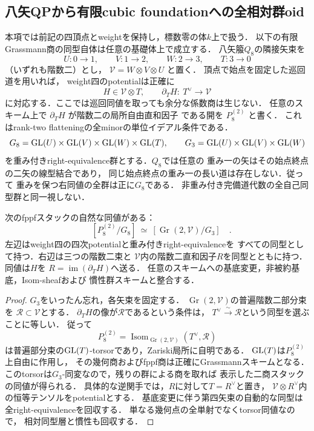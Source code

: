 
\subsection{八矢QPから有限cubic foundationへの全相対群oid}
\label{subsec:qa-cubic-qp-foundation-groupoid}

本項では前記の四頂点とweightを保持し，標数零の体$k$上で扱う．
以下の有限Grassmann商の同型自体は任意の基礎体上で成立する．
八矢箙$Q_8$の隣接矢束を
\[
 U:0\to1,\qquad V:1\to2,\qquad W:2\to3,\qquad T:3\to0
\]
（いずれも階数二）とし，
\(\mathcal V=W\otimes V\otimes U\) と置く．
頂点で始点を固定した巡回道を用いれば，
weight四のpotentialは正確に
\[
 H\in\mathcal V\otimes T,\qquad
 \partial_T H:\ T^\vee\longrightarrow\mathcal V
 \tag{QP8}\label{eq:qa-cubic-qp-flattening}
\]
に対応する．ここでは巡回同値を取っても余分な係数商は生じない．
任意のスキーム上で \(\partial_T H\) が階数二の局所自由直和因子
である開を \(P_8^{(2)}\) と書く．
これはrank-two flatteningの全minorの単位イデアル条件である．
\[
 G_8=\operatorname{GL}(U)\times\operatorname{GL}(V)\times\operatorname{GL}(W)\times\operatorname{GL}(T),
 \qquad G_3=\operatorname{GL}(U)\times\operatorname{GL}(V)\times\operatorname{GL}(W)
\]
を重み付きright-equivalence群とする．$Q_8$では任意の
重み一の矢はその始点終点の二矢の線型結合であり，
同じ始点終点の重み一の長い道は存在しない．従って
重みを保つ右同値の全群は正に$G_8$である．
非重み付き完備道代数の全自己同型群と同一視しない．

\begin{theorem}[八矢QPと階数二関係束の相対groupoid同値]
\label{thm:qa-cubic-qp-grassmann-groupoid}
次のfppfスタックの自然な同値がある：
\[
 \boxed{\quad
 [P_8^{(2)}/G_8]\ \simeq\
 [\operatorname{Gr}(2,\mathcal V)/G_3]\quad}.
 \tag{QG}\label{eq:qa-cubic-qp-grassmann-stack}
\]
左辺はweight四の四次potentialと重み付きright-equivalenceを
すべての同型として持つ．右辺は三つの階数二束と
$\mathcal V$内の階数二直和因子$R$を同型とともに持つ．
同値は$H$を
$R=\operatorname{im}(\partial_T H)$へ送る．
任意のスキームへの基底変更，非被約基底，Isom-sheafおよび
慣性群スキームと整合する．
\end{theorem}
\begin{proof}
$G_3$をいったん忘れ，各矢束を固定する．
$\operatorname{Gr}(2,\mathcal V)$の普遍階数二部分束を
$\mathcal R\subset\mathcal V$とする．
$\partial_T H$の像が$\mathcal R$であるという条件は，
$T^\vee\xrightarrow{\sim}\mathcal R$という同型を選ぶことに等しい．
従って
\[
 P_8^{(2)}
 =\operatorname{Isom}_{\operatorname{Gr}(2,\mathcal V)}
       (T^\vee,\mathcal R)
\]
は普遍部分束の$\operatorname{GL}(T)$-torsorであり，Zariski局所に自明である．
$\operatorname{GL}(T)$は$P_8^{(2)}$上自由に作用し，
その幾何商およびfppf商は正確にGrassmannスキームとなる．
このtorsorは$G_3$-同変なので，残りの群による商を取れば
表示した二商スタックの同値が得られる．
具体的な逆関手では，$R$に対して$T=R^\vee$と置き，
$\mathcal V\otimes R^\vee$内の恒等テンソルをpotentialとする．
基底変更に伴う第四矢束の自動的な同型は全right-equivalenceを回収する．
単なる幾何点の全単射でなくtorsor同値なので，
相対同型層と慣性も回収する．
\end{proof}

